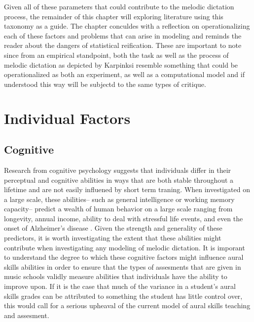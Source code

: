 \documentclass[]{book}
\begin{document}
Given all of these parameters that could contribute to the melodic dictation process, the remainder of this chapter will exploring literature using this taxonomy as a guide.
The chapter conculdes with a reflection on operationalizing each of these factors and problems that can arise in modeling and reminds the reader about the dangers of statistical reification.
These are important to note since from an empirical standpoint, both the task as well as the process of melodic dictation as depicted by Karpinksi resemble something that could be operationalized as both an experiment, as well as a computational model and if understood this way will be subjectd to the same types of critique.

\hypertarget{individual-factors}{%
\section{Individual Factors}\label{individual-factors}}

\hypertarget{cognitive}{%
\subsection{Cognitive}\label{cognitive}}

Research from cognitive psychology suggests that individuals differ in their perceptual and cognitive abilities in ways that are both stable throughout a lifetime and are not easily influened by short term traning.
When investigated on a large scale, these abilities-- such as general intelligence or working memory capacity-- predict a wealth of human behavior on a large scale ranging from longevity, annual income, ability to deal with stressful life events, and even the onset of Alzheimer's disease \citep{ritchieIntelligenceAllThat2015, unsworthAutomatedVersionOperation2005}.
Given the strength and generality of these predictors, it is worth investigating the extent that these abilities might contribute when investigating any modeling of melodic dictation.
It is imporant to understand the degree to which these cognitive factors might influence aural skills abilities in order to ensure that the types of assesments that are given in music schools validly measure abilities that individuals have the ability to improve upon.
If it is the case that much of the variance in a student's aural skills grades can be attributed to something the student has little control over, this would call for a serious upheaval of the current model of aural skills teaching and assesment.
\end{document}

